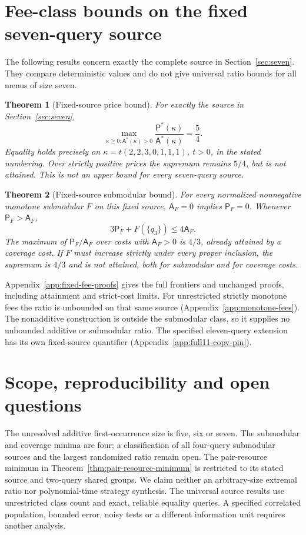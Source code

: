 \documentclass[pdflatex,sn-mathphys-num]{sn-jnl}
\newcommand{\A}{\mathsf{A}}
\newcommand{\Pcost}{\mathsf{P}}
\theoremstyle{thmstyleone}
\newtheorem{theorem}{Theorem}
\theoremstyle{thmstylethree}
\theoremstyle{thmstyletwo}
\begin{document}
\section{Fee-class bounds on the fixed seven-query source}
\label{sec:fixed-cost-core}
The following results concern exactly the complete source in
Section~\ref{sec:seven}. They compare deterministic values and do not
give universal ratio bounds for all menus of size seven.

\begin{theorem}[Fixed-source price bound]\label{thm:price}
For exactly the source in Section~\ref{sec:seven},
\[
 \max_{\kappa\geq0:\A^*(\kappa)>0}
 \frac{\Pcost^*(\kappa)}{\A^*(\kappa)}=\frac54.
\]
Equality holds precisely on $\kappa=t(2,2,3,0,1,1,1)$, $t>0$, in the stated numbering. Over strictly positive prices the supremum remains $5/4$, but is not attained. This is not an upper bound for every seven-query source.
\end{theorem}

\begin{theorem}[Fixed-source submodular bound]\label{thm:submodular}
For every normalized nonnegative monotone submodular $F$ on this fixed source, $\A_F=0$ implies $\Pcost_F=0$. Whenever $\Pcost_F>\A_F$,
\begin{equation}\label{eq:strengthened}
 3\Pcost_F+F(\{q_3\})\leq4\A_F.
\end{equation}
The maximum of $\Pcost_F/\A_F$ over costs with $\A_F>0$ is $4/3$, already attained by a coverage cost. If $F$ must increase strictly under every proper inclusion, the supremum is $4/3$ and is not attained, both for submodular and for coverage costs.
\end{theorem}

Appendix~\ref{app:fixed-fee-proofs} gives the full frontiers and
unchanged proofs, including attainment and strict-cost limits.
For unrestricted strictly monotone fees the ratio is unbounded on
that same source (Appendix~\ref{app:monotone-fees}). The nonadditive
construction is outside the submodular class, so it supplies no
unbounded additive or submodular ratio. The specified eleven-query
extension has its own fixed-source quantifier
(Appendix~\ref{app:full11-copy-pin}).

\section{Scope, reproducibility and open questions}
\label{sec:scope-core}
The unresolved additive first-occurrence size is five, six or seven.
The submodular and coverage minima are four; a classification of all
four-query submodular sources and the largest randomized ratio remain
open. The pair-resource minimum in Theorem~\ref{thm:pair-resource-minimum}
is restricted to its stated source and two-query shared groups. We claim
neither an arbitrary-size extremal ratio nor polynomial-time strategy synthesis.
The universal source results use unrestricted class count and exact,
reliable equality queries. A specified correlated population, bounded
error, noisy tests or a different information unit requires another analysis.
\end{document}
